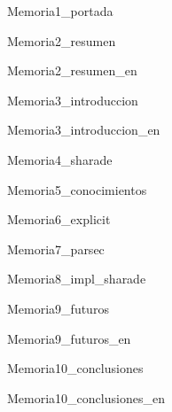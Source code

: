 \documentclass[12pt, titlepage]{article}
\begin{document}
{Memoria1_portada}
\tableofcontents
\newpage

{Memoria2_resumen}
\newpage

{Memoria2_resumen_en}
\newpage

{Memoria3_introduccion}
\newpage

{Memoria3_introduccion_en}
\newpage

{Memoria4_sharade}
\newpage

{Memoria5_conocimientos}
\newpage

{Memoria6_explicit}
\newpage

{Memoria7_parsec}
\newpage

{Memoria8_impl_sharade}
\newpage

{Memoria9_futuros}
\newpage

{Memoria9_futuros_en}
\newpage

{Memoria10_conclusiones}
\newpage

{Memoria10_conclusiones_en}
\newpage



\end{document}
